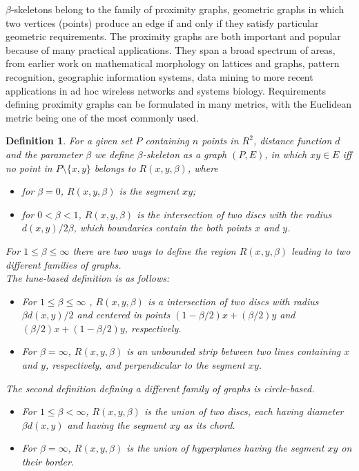 \documentclass[10pt]{article}
\newtheorem{definition}{\textbf{Definition}}[section]
\begin{document}
$\beta$-skeletons \cite{kr85} belong to the family of
proximity graphs, geometric graphs in which two vertices (points) produce an edge if and only if 
they satisfy particular geometric requirements. 
The proximity graphs are both important and popular because of many practical applications. 
They span a broad spectrum of areas, from earlier work on mathematical 
morphology on lattices and graphs, pattern recognition, geographic information systems, 
data mining to more recent applications in ad hoc wireless networks and  systems biology. 
Requirements defining proximity graphs can be formulated in many metrics, with the Euclidean metric 
being one of the most commonly used. 
\begin{definition}
For a given set $P$ containing $n$ points in $R^2$, distance function $d$ and the 
parameter $\beta$  we define $\beta$-skeleton as a graph $(P , E)$, in which $xy \in E$ 
iff no point in $P \setminus \{x,y\}$ belongs to $R(x,y, \beta)$, where 
\begin{itemize}
\item 
for $\beta = 0$, $R(x,y, \beta)$ is the segment $xy$;
\item 
for $0 < \beta < 1$, $R(x,y, \beta)$ is the intersection  of two discs with the radius 
$d(x,y)/2\beta$, which boundaries contain the both points $x$ and $y$. 
\end{itemize}
For  $1 \leq \beta \leq \infty$ there are two ways to define the region $R(x,y, \beta)$ leading to two different 
families of graphs. \\
The lune-based definition is as follows:
\begin{itemize}
\item 
For  $1 \leq \beta \leq \infty$ , $R(x,y, \beta)$ is a intersection of two discs with radius 
$\beta d(x,y)/2$ and centered in points $(1-\beta/2)x+(\beta/2)y$ and $(\beta/2)x+(1-\beta/2)y$, 
respectively.   
\item 
For $\beta = \infty$, $R(x,y, \beta)$ is an unbounded strip between two lines containing $x$ 
and $y$, respectively, and perpendicular to the segment $xy$. 
\end{itemize} 
The second definition defining a different family of graphs is circle-based.
\begin{itemize}
\item
For $1 \leq \beta < \infty$, $R(x,y, \beta)$ is the union  of two discs, each having diameter 
$\beta d(x,y)$ and having the segment $xy$ as its chord.
 \item
For $\beta = \infty$, $R(x,y, \beta)$ is the union of hyperplanes having the segment $xy$ on 
their border.
\end{itemize}

\end{definition}
\end{document}

